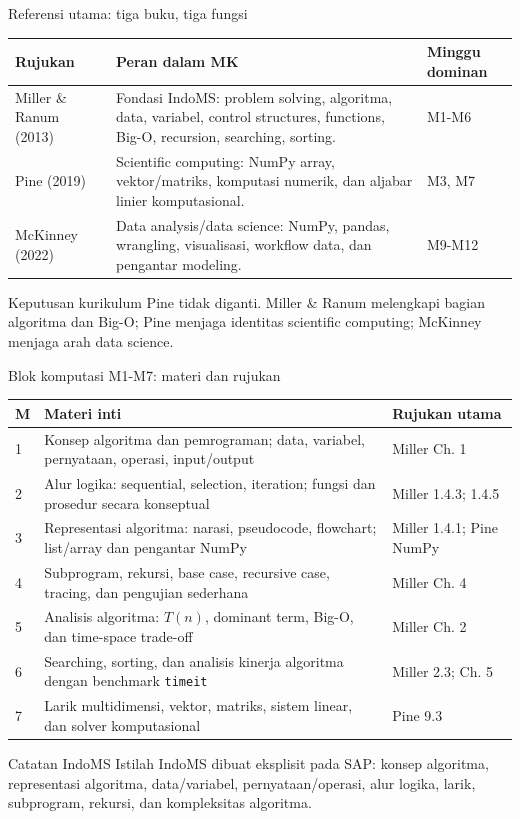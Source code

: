 \documentclass[aspectratio=169,11pt]{beamer}
\begin{document}
\begin{frame}{Referensi utama: tiga buku, tiga fungsi}
\small
\begin{tabular}{p{2.75cm}p{5.45cm}p{4.6cm}}
\toprule
\textbf{Rujukan} & \textbf{Peran dalam MK} & \textbf{Minggu dominan} \\
\midrule
Miller \& Ranum (2013) & Fondasi IndoMS: problem solving, algoritma, data, variabel, control structures, functions, Big-O, recursion, searching, sorting. & M1-M6 \\
Pine (2019) & Scientific computing: NumPy array, vektor/matriks, komputasi numerik, dan aljabar linier komputasional. & M3, M7 \\
McKinney (2022) & Data analysis/data science: NumPy, pandas, wrangling, visualisasi, workflow data, dan pengantar modeling. & M9-M12 \\
\bottomrule
\end{tabular}
\vspace{2mm}
\begin{block}{Keputusan kurikulum}
Pine tidak diganti. Miller \& Ranum melengkapi bagian algoritma dan Big-O; Pine menjaga identitas scientific computing; McKinney menjaga arah data science.
\end{block}
\end{frame}


\begin{frame}{Blok komputasi M1-M7: materi dan rujukan}
\scriptsize
\begin{tabular}{p{.7cm}p{7.3cm}p{4.2cm}}
\toprule
\textbf{M} & \textbf{Materi inti} & \textbf{Rujukan utama} \\
\midrule
1 & Konsep algoritma dan pemrograman; data, variabel, pernyataan, operasi, input/output & Miller Ch. 1 \\
2 & Alur logika: sequential, selection, iteration; fungsi dan prosedur secara konseptual & Miller 1.4.3; 1.4.5 \\
3 & Representasi algoritma: narasi, pseudocode, flowchart; list/array dan pengantar NumPy & Miller 1.4.1; Pine NumPy \\
4 & Subprogram, rekursi, base case, recursive case, tracing, dan pengujian sederhana & Miller Ch. 4 \\
5 & Analisis algoritma: $T(n)$, dominant term, Big-O, dan time-space trade-off & Miller Ch. 2 \\
6 & Searching, sorting, dan analisis kinerja algoritma dengan benchmark \texttt{timeit} & Miller 2.3; Ch. 5 \\
7 & Larik multidimensi, vektor, matriks, sistem linear, dan solver komputasional & Pine 9.3 \\
\bottomrule
\end{tabular}
\vspace{1.5mm}
\begin{block}{Catatan IndoMS}
Istilah IndoMS dibuat eksplisit pada SAP: konsep algoritma, representasi algoritma, data/variabel, pernyataan/operasi, alur logika, larik, subprogram, rekursi, dan kompleksitas algoritma.
\end{block}
\end{frame}
\end{document}
